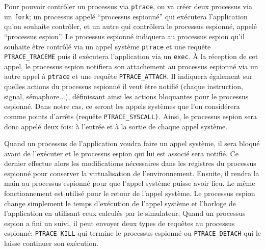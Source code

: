 Pour pouvoir contrôler un processus via \texttt{ptrace}, on va créer deux
processus via un \texttt{fork}; un processus appelé ``processus espionné'' qui
exécutera l'application qu'on souhaite contrôler, et un autre qui contrôlera le
processus espionné, appelé ``processus espion''. Le processus espionné indiquera
au processus espion qu'il souhaite être contrôlé via un appel
système \texttt{ptrace} et une requête \texttt{PTRACE\_TRACEME} puis il
exécutera l'application via un \texttt{exec}. À la réception de cet appel, le
processus espion notifiera son attachement au processus espionné via un autre
appel à \texttt{ptrace} et une requête \texttt{PTRACE\_ATTACH}. Il indiquera
également sur quelles actions du processus espionné il veut être notifié (chaque
instruction, signal, sémaphore...), définissant ainsi les actions bloquantes
pour le processus espionné. Dans notre cas, ce seront les appels systèmes que
l'on considérera comme points d'arrêts (requête
\texttt{PTRACE\_SYSCALL)}. Ainsi, le processus espion sera donc appelé deux
fois: à l'entrée et à la sortie de chaque appel système.

Quand un processus de l'application voudra faire un appel système, il sera
bloqué avant de l'exécuter et le processus espion qui lui est associé sera
notifié. Ce dernier effectue alors les modifications nécessaires dans les
registres du processus espionné pour conserver la virtualisation de
l'environnement. Ensuite, il rendra la main au processus espionné pour que
l'appel système puisse avoir lieu. Le même fonctionnement est utilisé pour le
retour de l'appel système. Le processus espion change simplement le temps
d'exécution de l'appel système et l'horloge de l'application en utilisant ceux
calculés par le simulateur. Quand un processus espion a fini un suivi, il peut
envoyer deux types de requêtes au processus espionné: \texttt{PTRACE\_KILL} qui
termine le processus espionné ou \texttt{PTRACE\_DETACH} qui le laisse continuer
son exécution.

